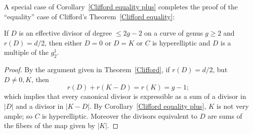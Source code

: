 A special case of Corollary~\ref{Clifford equality plus} completes the proof of the ``equality'' case of Clifford's Theorem~\ref{Clifford equality}:

\begin{corollary}\label{Clifford equality proven}
If $D$ is an effective divisor  of degree $\leq 2g-2$ on a curve of genus $g\geq 2$ and $r(D) = d/2$, then either $D= 0$ or 
$D=K$ or $C$ is hyperelliptic and $D$ is a multiple of the $g^1_2$.
\end{corollary}

\begin{proof}
  By the argument given in Theorem~\ref{Clifford}, if $r(D) = d/2$, but $D\neq 0,K$, then
$$
r(D) + r(K-D) = r(K) = g-1;
$$
which implies that every canonical divisor is expressible as a sum of a divisor in $|D|$ and a divisor in $|K-D|$.
By Corollary~\ref{Clifford equality plus}, $K$ is not very ample; so $C$ is hyperelliptic. Moreover the
divisors equivalent to $D$ are sums of the fibers of the map given by $|K|$.
\end{proof}




%
%


